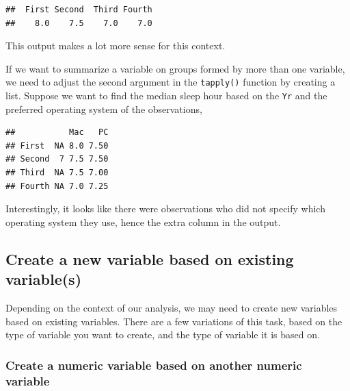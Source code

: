 \documentclass[
]{book}
\newenvironment{Shaded}{\begin{snugshade}}{\end{snugshade}}
\newcommand{\AttributeTok}[1]{\textcolor[rgb]{0.13,0.29,0.53}{#1}}
\newcommand{\FunctionTok}[1]{\textcolor[rgb]{0.13,0.29,0.53}{\textbf{#1}}}
\newcommand{\NormalTok}[1]{#1}
\newcommand{\SpecialCharTok}[1]{\textcolor[rgb]{0.81,0.36,0.00}{\textbf{#1}}}
\begin{document}
\begin{verbatim}
##  First Second  Third Fourth 
##    8.0    7.5    7.0    7.0
\end{verbatim}

This output makes a lot more sense for this context.

If we want to summarize a variable on groups formed by more than one variable, we need to adjust the second argument in the \texttt{tapply()} function by creating a list. Suppose we want to find the median sleep hour based on the \texttt{Yr} and the preferred operating system of the observations,

\begin{Shaded}
\end{Shaded}

\begin{verbatim}
##           Mac   PC
## First  NA 8.0 7.50
## Second  7 7.5 7.50
## Third  NA 7.5 7.00
## Fourth NA 7.0 7.25
\end{verbatim}

Interestingly, it looks like there were observations who did not specify which operating system they use, hence the extra column in the output.

\hypertarget{create-a-new-variable-based-on-existing-variables}{%
\subsection{Create a new variable based on existing variable(s)}\label{create-a-new-variable-based-on-existing-variables}}

Depending on the context of our analysis, we may need to create new variables based on existing variables. There are a few variations of this task, based on the type of variable you want to create, and the type of variable it is based on.

\hypertarget{create-a-numeric-variable-based-on-another-numeric-variable}{%
\subsubsection{Create a numeric variable based on another numeric variable}\label{create-a-numeric-variable-based-on-another-numeric-variable}}
\end{document}
